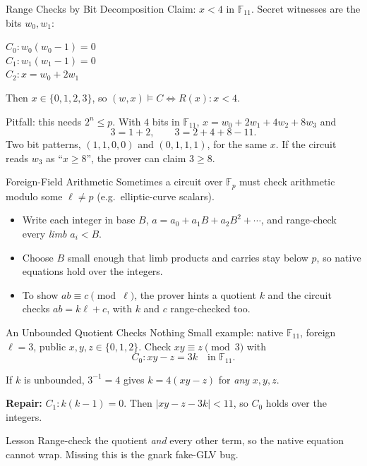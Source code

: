 \documentclass[aspectratio=169,11pt]{beamer}
\newcommand{\F}{\mathbb F}
\begin{document}
\begin{frame}{Range Checks by Bit Decomposition}
Claim: $x < 4$ in $\mathbb F_{11}$. Secret witnesses are the bits $w_0, w_1$:

$C_0: w_0(w_0 - 1) = 0$\\
$C_1: w_1(w_1 - 1) = 0$\\
$C_2: x = w_0 + 2w_1$\\
\pause

Then $x \in \{0, 1, 2, 3\}$, so $(w, x) \vDash C \Leftrightarrow R(x): x < 4$.
\pause

Pitfall: this needs $2^n \leq p$. With $4$ bits in $\mathbb F_{11}$, $x = w_0 + 2w_1 + 4w_2 + 8w_3$ and
\[3 = 1 + 2,\qquad 3 = 2 + 4 + 8 - 11.\]
Two bit patterns, $(1, 1, 0, 0)$ and $(0, 1, 1, 1)$, for the same $x$. If the circuit reads $w_3$ as ``$x \geq 8$'', the prover can claim $3 \geq 8$.
\end{frame}

\begin{frame}{Foreign-Field Arithmetic}
Sometimes a circuit over $\F_p$ must check arithmetic modulo some $\ell \neq p$ (e.g.\ elliptic-curve scalars).
\pause
\begin{itemize}
\item Write each integer in base $B$, $a = a_0 + a_1 B + a_2 B^2 + \cdots$, and range-check every \emph{limb} $a_i < B$. \pause
\item Choose $B$ small enough that limb products and carries stay below $p$, so native equations hold over the integers. \pause
\item To show $ab \equiv c \pmod \ell$, the prover hints a quotient $k$ and the circuit checks $ab = k\ell + c$, with $k$ and $c$ range-checked too.
\end{itemize}
\end{frame}

\begin{frame}{An Unbounded Quotient Checks Nothing}
Small example: native $\F_{11}$, foreign $\ell = 3$, public $x, y, z \in \{0, 1, 2\}$. Check $xy \equiv z \pmod 3$ with
\[C_0: xy - z = 3k \quad\text{in } \F_{11}.\]
\pause

If $k$ is unbounded, $3^{-1} = 4$ gives $k = 4(xy - z)$ for \emph{any} $x, y, z$.
\pause

\textbf{Repair:} $C_1: k(k-1) = 0$. Then $|xy - z - 3k| < 11$, so $C_0$ holds over the integers.
\pause

\begin{block}{Lesson}
Range-check the quotient \emph{and} every other term, so the native equation cannot wrap. Missing this is the gnark fake-GLV bug.
\end{block}
\end{frame}
\end{document}
